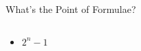 \documentclass[10pt]{beamer}
\begin{document}
\begin{frame}{What's the Point of Formulae?}
	
	\begin{columns}	
		\begin{column}{0.5\textwidth}
			\begin{itemize}[<+->]
				\item $2^n - 1$				
			\end{itemize}
		\end{column}
		\begin{column}{0.5\textwidth}
			\begin{figure}[h]		
				\centering
				\caption*{}
			\end{figure}
		\end{column}
	\end{columns}

	
\end{frame}
\end{document}
